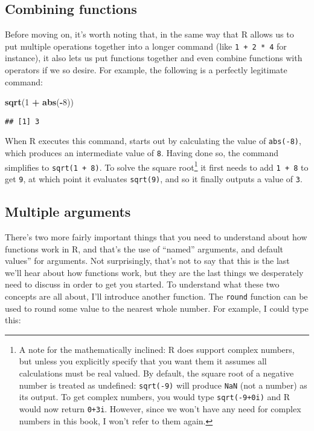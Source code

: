 \documentclass[]{book}
\newenvironment{Shaded}{\begin{snugshade}}{\end{snugshade}}
\newcommand{\DecValTok}[1]{\textcolor[rgb]{0.00,0.00,0.81}{#1}}
\newcommand{\KeywordTok}[1]{\textcolor[rgb]{0.13,0.29,0.53}{\textbf{#1}}}
\newcommand{\NormalTok}[1]{#1}
\newcommand{\OperatorTok}[1]{\textcolor[rgb]{0.81,0.36,0.00}{\textbf{#1}}}
\newcommand{\StringTok}[1]{\textcolor[rgb]{0.31,0.60,0.02}{#1}}
\let\rmarkdownfootnote\footnote%
\def\footnote{\protect\rmarkdownfootnote}
\begin{document}
\hypertarget{combining-functions}{%
\subsection{Combining functions}\label{combining-functions}}

Before moving on, it's worth noting that, in the same way that R allows us to put multiple operations together into a longer command (like \texttt{1\ +\ 2\ *\ 4} for instance), it also lets us put functions together and even combine functions with operators if we so desire. For example, the following is a perfectly legitimate command:

\begin{Shaded}
\begin{Highlighting}[]
\KeywordTok{sqrt}\NormalTok{(}\DecValTok{1} \OperatorTok{+}\StringTok{ }\KeywordTok{abs}\NormalTok{(}\OperatorTok{-}\DecValTok{8}\NormalTok{))}
\end{Highlighting}
\end{Shaded}

\begin{verbatim}
## [1] 3
\end{verbatim}

When R executes this command, starts out by calculating the value of \texttt{abs(-8)}, which produces an intermediate value of \texttt{8}. Having done so, the command simplifies to \texttt{sqrt(1\ +\ 8)}. To solve the square root\footnote{A note for the mathematically inclined: R does support complex numbers, but unless you explicitly specify that you want them it assumes all calculations must be real valued. By default, the square root of a negative number is treated as undefined: \texttt{sqrt(-9)} will produce \texttt{NaN} (not a number) as its output. To get complex numbers, you would type \texttt{sqrt(-9+0i)} and R would now return \texttt{0+3i}. However, since we won't have any need for complex numbers in this book, I won't refer to them again.} it first needs to add \texttt{1\ +\ 8} to get \texttt{9}, at which point it evaluates \texttt{sqrt(9)}, and so it finally outputs a value of \texttt{3}.

\hypertarget{multiple-arguments}{%
\subsection{Multiple arguments}\label{multiple-arguments}}

There's two more fairly important things that you need to understand about how functions work in R, and that's the use of ``named'' arguments, and default values'' for arguments. Not surprisingly, that's not to say that this is the last we'll hear about how functions work, but they are the last things we desperately need to discuss in order to get you started. To understand what these two concepts are all about, I'll introduce another function. The \texttt{round} function can be used to round some value to the nearest whole number. For example, I could type this:
\end{document}
